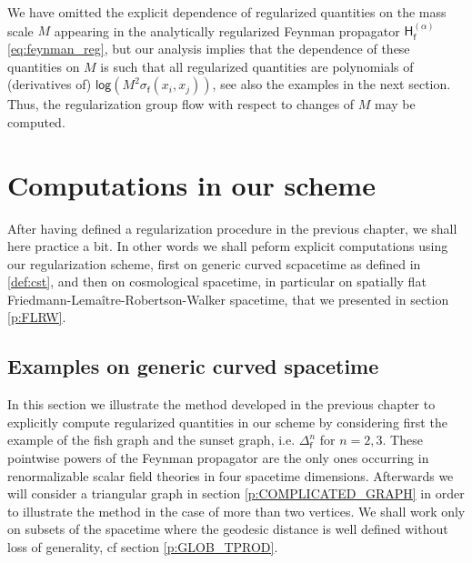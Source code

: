 \documentclass[11pt]{book}
\renewcommand{\log}{\mathsf{log}}
\newcommand{\Hsf}{\mathsf{H}}
\newcommand{\fsf}{\mathsf{f}}
\theoremstyle{break}
\begin{document}
\bigskip


We have omitted the explicit dependence of regularized quantities on the mass scale $M$ appearing in the analytically regularized Feynman propagator $\Hsf^{(\alpha)}_\fsf$ \eqref{eq:feynman_reg}, but our analysis implies that the dependence of these quantities on $M$ is such that all regularized quantities are polynomials of (derivatives of) $\log\left( M^2 \sigma_\fsf(x_i,x_j)\right)$, see also the examples in the next section. Thus, the regularization group flow with respect to changes of $M$ may be computed.


\chapter{Computations in our scheme}


After having defined a regularization procedure in the previous chapter, we shall here practice a bit. In other words we shall peform explicit computations using our regularization scheme, first on generic curved scpacetime as defined in \ref{def:cst}, and then on cosmological spacetime, in particular on spatially flat Friedmann-Lemaître-Robertson-Walker spacetime, that we presented in section \ref{p:FLRW}.


\section{Examples on generic curved spacetime}


In this section we illustrate the method developed in the previous chapter to explicitly compute regularized quantities in our scheme by considering first the example of the fish graph and the sunset graph, i.e. $\Delta^n_\fsf$ for $n=2,3$. These pointwise powers of the Feynman propagator are the only ones occurring in renormalizable scalar field theories in four spacetime dimensions. Afterwards we will consider a triangular graph in section \ref{p:COMPLICATED_GRAPH} in order to illustrate the method in the case of more than two vertices. We shall work only on subsets of the spacetime where the geodesic distance is well defined without loss of generality, cf section \ref{p:GLOB_TPROD}.
\end{document}
